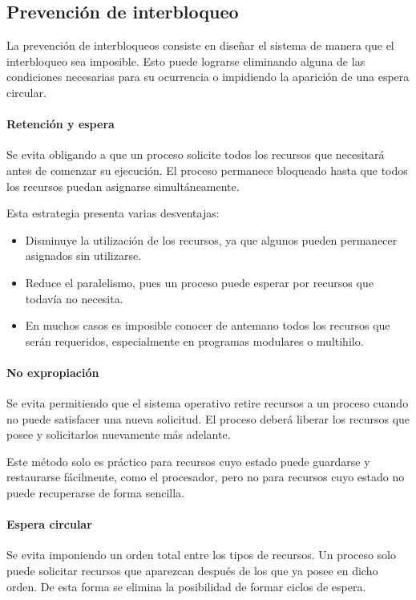 \subsection{Prevención de interbloqueo}

La prevención de interbloqueos consiste en diseñar el sistema de manera que el interbloqueo sea imposible. Esto puede lograrse eliminando alguna de las condiciones necesarias para su ocurrencia o impidiendo la aparición de una espera circular.

\paragraph{Retención y espera}
Se evita obligando a que un proceso solicite todos los recursos que necesitará antes de comenzar su ejecución. El proceso permanece bloqueado hasta que todos los recursos puedan asignarse simultáneamente.

Esta estrategia presenta varias desventajas:
\begin{itemize}
  \item Disminuye la utilización de los recursos, ya que algunos pueden permanecer asignados sin utilizarse.
  \item Reduce el paralelismo, pues un proceso puede esperar por recursos que todavía no necesita.
  \item En muchos casos es imposible conocer de antemano todos los recursos que serán requeridos, especialmente en programas modulares o multihilo.
\end{itemize}

\paragraph{No expropiación}
Se evita permitiendo que el sistema operativo retire recursos a un proceso cuando no puede satisfacer una nueva solicitud. El proceso deberá liberar los recursos que posee y solicitarlos nuevamente más adelante.

Este método solo es práctico para recursos cuyo estado puede guardarse y restaurarse fácilmente, como el procesador, pero no para recursos cuyo estado no puede recuperarse de forma sencilla.

\paragraph{Espera circular}
Se evita imponiendo un orden total entre los tipos de recursos. Un proceso solo puede solicitar recursos que aparezcan después de los que ya posee en dicho orden. De esta forma se elimina la posibilidad de formar ciclos de espera.

